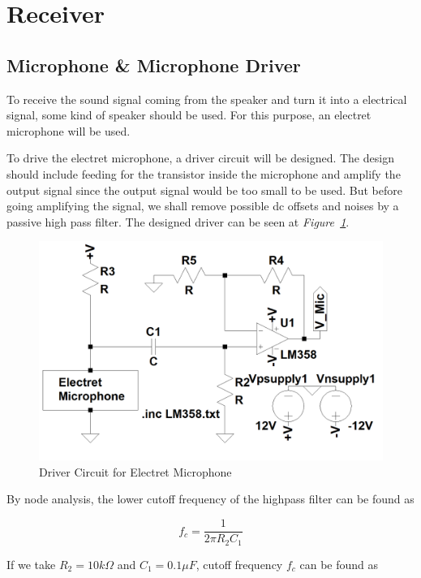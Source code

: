 \documentclass[paper]{IEEEtran}
\begin{document}
\section{Receiver}

\subsection{Microphone \& Microphone Driver}
	To receive the sound signal coming from the speaker and turn it into a electrical signal, some kind of speaker should be used. For this purpose, an electret microphone will be used. 
	
	To drive the electret microphone, a driver circuit will be designed. The design should include feeding for the transistor inside the microphone and amplify the output signal since the output signal would be too small to be used. But before going amplifying the signal, we shall remove possible dc offsets and noises by a passive high pass filter. The designed driver can be seen at \textit{Figure~\ref{fig:micdr}}.

\begin{figure}[h!]
\setlength{\unitlength}{\textwidth}
\center 
\includegraphics[width=0.45\unitlength]{micv2.png}
\caption{\label{fig:micdr}Driver Circuit for Electret Microphone }
\end{figure}	


By node analysis, the lower cutoff frequency of the highpass filter can be found as

$$ f_{c} =\frac{1}{2\pi R_{2}C_{1}} $$

If we take $R_{2}=10k\Omega$ and $C_{1}=0.1\mu F$, cutoff frequency $f_c$ can be found as
\end{document}
